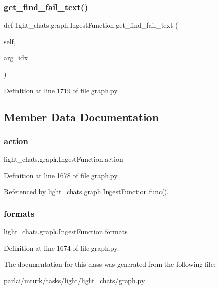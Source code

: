 \subsubsection{\texorpdfstring{get\+\_\+find\+\_\+fail\+\_\+text()}{get\_find\_fail\_text()}}
{\footnotesize\ttfamily def light\+\_\+chats.\+graph.\+Ingest\+Function.\+get\+\_\+find\+\_\+fail\+\_\+text (\begin{DoxyParamCaption}\item[{}]{self,  }\item[{}]{arg\+\_\+idx }\end{DoxyParamCaption})}



Definition at line 1719 of file graph.\+py.



\subsection{Member Data Documentation}
\mbox{\label{classlight__chats_1_1graph_1_1IngestFunction_a622f30ce7ef9f3c210c1881eab7c2744}} 
\subsubsection{\texorpdfstring{action}{action}}
{\footnotesize\ttfamily light\+\_\+chats.\+graph.\+Ingest\+Function.\+action}



Definition at line 1678 of file graph.\+py.



Referenced by light\+\_\+chats.\+graph.\+Ingest\+Function.\+func().

\mbox{\label{classlight__chats_1_1graph_1_1IngestFunction_af639522820335d377bf31825afe21584}} 
\subsubsection{\texorpdfstring{formats}{formats}}
{\footnotesize\ttfamily light\+\_\+chats.\+graph.\+Ingest\+Function.\+formats}



Definition at line 1674 of file graph.\+py.



The documentation for this class was generated from the following file\+:\begin{DoxyCompactItemize}
\item 
parlai/mturk/tasks/light/light\+\_\+chats/\hyperlink{parlai_2mturk_2tasks_2light_2light__chats_2graph_8py}{graph.\+py}\end{DoxyCompactItemize}

